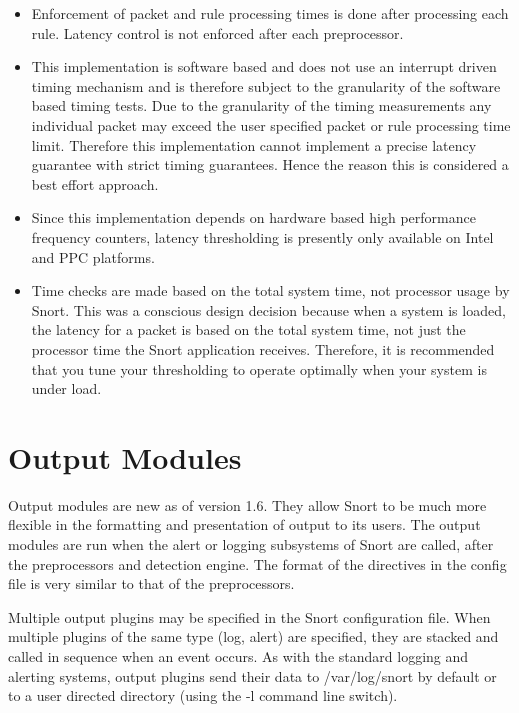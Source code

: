 \documentclass[english]{report}
\begin{document}
\begin{itemize}

\item Enforcement of packet and rule processing times is done after processing
each rule.  Latency control is not enforced after each preprocessor.  

\item This implementation is software based and does not use an interrupt
driven timing mechanism and is therefore subject to the granularity of the
software based timing tests. Due to the granularity of the timing measurements
any individual packet may exceed the user specified packet or rule processing
time limit.  Therefore this implementation cannot implement a precise latency
guarantee with strict timing guarantees.  Hence the reason this is considered a
best effort approach.

\item Since this implementation depends on hardware based high performance
frequency counters, latency thresholding is presently only available on Intel
and PPC platforms. 

\item Time checks are made based on the total system time, not processor usage
by Snort.  This was a conscious design decision because when a system is
loaded, the latency for a packet is based on the total system time, not just
the processor time the Snort application receives.  Therefore, it is
recommended that you tune your thresholding to operate optimally when your
system is under load.

\end{itemize}

\section{Output Modules}
\label{output config}

Output modules are new as of version 1.6. They allow Snort to be much more
flexible in the formatting and presentation of output to its users. The output
modules are run when the alert or logging subsystems of Snort are called, after
the preprocessors and detection engine.  The format of the directives in the
config file is very similar to that of the preprocessors.

Multiple output plugins may be specified in the Snort configuration file. When
multiple plugins of the same type (log, alert) are specified, they are stacked
and called in sequence when an event occurs. As with the standard logging and
alerting systems, output plugins send their data to /var/log/snort by default
or to a user directed directory (using the -l command line switch).
\end{document}
